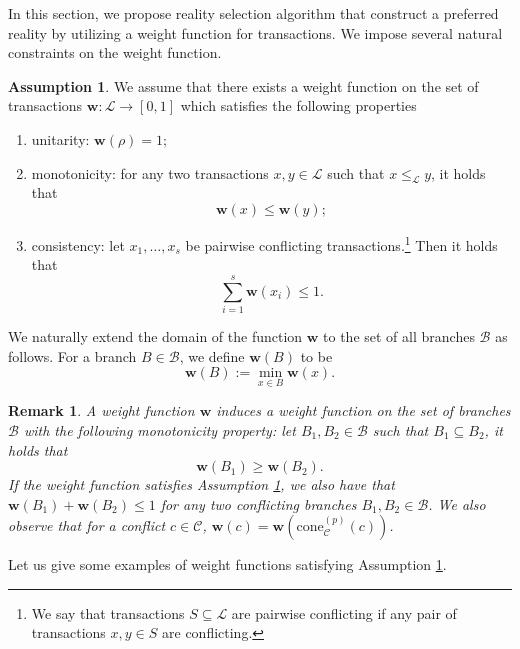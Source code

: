 \documentclass[11pt]{article}
\newcommand{\orig}{\rho}
\newcommand{\AW}{\mathbf{w}}
\newcommand{\branchset}{\mathcal{B}}
\newcommand{\conflictset}{\mathcal{C}}
\newcommand{\ledger}{\mathcal{L}}
\newcommand{\cone}[3]{\mathrm{cone}_{#2}^{(#1)}\left(#3\right)}
\theoremstyle{plain}
\newtheorem{remark}{Remark}
\theoremstyle{definition}
\newtheorem{ass}{Assumption}
\numberwithin{definition}{section}
\numberwithin{lemma}{section}
\numberwithin{ass}{section}
\numberwithin{remark}{section}
\numberwithin{example}{section}
\numberwithin{proposition}{section}
\numberwithin{theorem}{section}
\begin{document}
In this section, we propose reality selection algorithm that construct a preferred reality by utilizing a weight function for transactions. We impose several natural constraints on the weight function.
\begin{ass}\label{ass: weight function on transaction}
We assume that there exists a weight function on the set of transactions $\AW: \ledger\to [0,1]$ which satisfies the following properties
\begin{enumerate}[leftmargin=*]
\item unitarity: $\AW (\orig)=1;$
\item monotonicity: for any two transactions  $x, y\in \ledger$ such that $x \le_{\ledger} y$, it holds that 
    $$
    \AW (x) \le \AW(y);
    $$
\item consistency: let $x_1,\ldots, x_s$ be pairwise conflicting transactions.\footnote{We say that transactions  $S\subseteq \ledger$ are pairwise conflicting if any pair of transactions $x, y\in S$ are conflicting. } Then it holds that 
$$
\sum_{i=1}^{s}\AW(x_i) \le 1.
$$
\end{enumerate} 
\end{ass}
We naturally extend the domain of the function $\AW$ to the set of all branches $\branchset$ as follows. For a branch $B\in\branchset$, we define $\AW(B)$ to be 
$$
\AW\left(B\right):=\min_{x\in B}\AW(x).
$$

\begin{remark}\label{rem: weight function on branches}
A weight function $\AW$ induces a weight function on the set of branches $\branchset$ with the following monotonicity property: let ${B}_1, {B}_2\in \branchset$ such that ${B}_1 \subseteq {B}_2$, it holds that 
\[
    \AW ({B}_1) \geq \AW({B}_2).
  \]  If the weight function satisfies Assumption \ref{ass: weight function on transaction}, we also have that  $\AW ({B}_1) + \AW({B}_2)\leq 1$ for any two conflicting branches ${B}_1, {B}_2\in \branchset$. We also observe that for a conflict $c\in\conflictset$, $\AW(c)=\AW(\cone{p}{\conflictset}{c})$.
\end{remark}

Let us give some examples of weight functions satisfying Assumption \ref{ass: weight function on transaction}.
\end{document}
